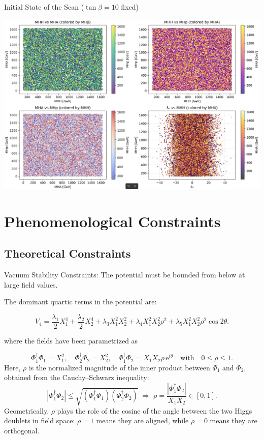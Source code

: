 \documentclass{../bredelebeamer}
\begin{document}
\begin{frame}{Initial State of the Scan ($\tan\beta=10$ fixed)}
  \begin{center}
    \includegraphics[width=\textwidth]{Initial_THDM_param_scan_analysis}
  \end{center}
\end{frame}


\section{Phenomenological Constraints}
\subsection{Theoretical Constraints}
\begin{frame}{{Vacuum Stability Constraints:}}
    The potential must be bounded from below at large field values.  

    \vfill
    The dominant quartic terms in the potential are:

    $$
    V_4 = \frac{\lambda_1}{2} X_1^4 + \frac{\lambda_2}{2} X_2^4 
    + \lambda_3 X_1^2 X_2^2 
    + \lambda_4 X_1^2 X_2^2 \rho^2
    + \lambda_5 X_1^2 X_2^2 \rho^2 \cos 2\theta .
    $$

    where the fields have been parametrized as

    $$
    \Phi_1^{\dagger} \Phi_1 = X_1^2, \quad 
    \Phi_2^{\dagger} \Phi_2 = X_2^2, \quad 
    \Phi_1^{\dagger} \Phi_2 = X_1 X_2 \rho \, \mathrm{e}^{i \theta} \quad \text{with} \quad 0 \leq \rho \leq 1 .
    $$
    \vfill
    Here, $\rho$ is the normalized magnitude of the inner product between $\Phi_1$ and $\Phi_2$, obtained from the Cauchy--Schwarz inequality:
    $$
    |\Phi_1^{\dagger} \Phi_2| \leq \sqrt{(\Phi_1^{\dagger} \Phi_1)(\Phi_2^{\dagger} \Phi_2)} \; \Rightarrow \; 
    \rho = \frac{|\Phi_1^{\dagger} \Phi_2|}{X_1 X_2} \in [0,1] .
    $$
    Geometrically, $\rho$ plays the role of the cosine of the angle between the two Higgs doublets in field space:
    $\rho = 1$ means they are aligned, while $\rho = 0$ means they are orthogonal.

    
    
\end{frame}
\end{document}
